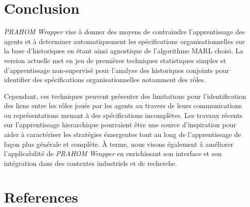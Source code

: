 \documentclass[demonstration]{jfsma}
\begin{document}
\section{Conclusion}

\emph{PRAHOM Wrapper} vise à donner des moyens de contraindre l'apprentissage des agents et à determiner automatiquement les spécifications organisationnelles sur la base d'historiques en étant ainsi agnostique de l'algorithme MARL choisi.
La version actuelle met en jeu de premières techniques statistiques simples et d'apprentissage non-supervisé pour l'analyse des historiques conjoints pour identifier des spécifications organisationnelles notamment des rôles.

Cependant, ces techniques peuvent présenter des limitations pour l'identification des liens entre les rôles joués par les agents au travers de leurs communications ou représentations menant à des spécifications incomplètes.
Les travaux récents sur l'apprentissage hierarchique pourraient être une source d'inspiration pour aider à caractériser les stratégies émergentes tout au long de l’apprentissage de façon plus générale et complète.
À terme, nous visons également à améliorer l'applicabilité de \emph{PRAHOM Wrapper} en enrichissant son interface et son intégration dans des contextes industriels et de recherche.






\section*{References}
\small


\end{document}
